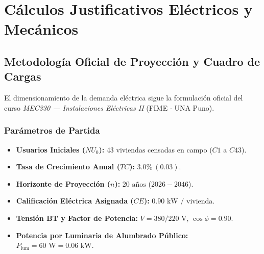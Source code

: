 \documentclass[12pt,a4paper]{report}
\begin{document}
\chapter{Cálculos Justificativos Eléctricos y Mecánicos}

\section{Metodología Oficial de Proyección y Cuadro de Cargas}
El dimensionamiento de la demanda eléctrica sigue la formulación oficial del curso \textit{MEC330 --- Instalaciones Eléctricas II} (FIME $\cdot$ UNA Puno).

\subsection{Parámetros de Partida}
\begin{itemize}
    \item \textbf{Usuarios Iniciales ($NU_0$):} $43\text{ viviendas}$ censadas en campo ($C1$ a $C43$).
    \item \textbf{Tasa de Crecimiento Anual ($TC$):} $3.0\%\ (0.03)$.
    \item \textbf{Horizonte de Proyección ($n$):} $20\text{ años}$ ($2026 - 2046$).
    \item \textbf{Calificación Eléctrica Asignada ($CE$):} $0.90\text{ kW / vivienda}$.
    \item \textbf{Tensión BT y Factor de Potencia:} $V = 380/220\text{ V}$, $\cos\phi = 0.90$.
    \item \textbf{Potencia por Luminaria de Alumbrado Público:} $P_{\text{lum}} = 60\text{ W} = 0.06\text{ kW}$.
\end{itemize}
\end{document}
